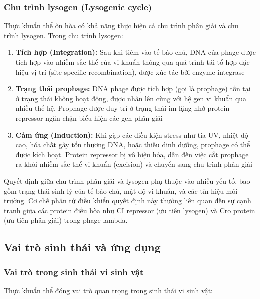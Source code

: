 \subsubsection{Chu trình lysogen (Lysogenic cycle)}

Thực khuẩn thể ôn hòa có khả năng thực hiện cả chu trình phân giải và chu trình lysogen. Trong chu trình lysogen:

\begin{enumerate}
    \item \textbf{Tích hợp (Integration):} Sau khi tiêm vào tế bào chủ, DNA của phage được tích hợp vào nhiễm sắc thể của vi khuẩn thông qua quá trình tái tổ hợp đặc hiệu vị trí (site-specific recombination), được xúc tác bởi enzyme integrase

    \item \textbf{Trạng thái prophage:} DNA phage được tích hợp (gọi là prophage) tồn tại ở trạng thái không hoạt động, được nhân lên cùng với hệ gen vi khuẩn qua nhiều thế hệ. Prophage được duy trì ở trạng thái im lặng nhờ protein repressor ngăn chặn biểu hiện các gen phân giải

    \item \textbf{Cảm ứng (Induction):} Khi gặp các điều kiện stress như tia UV, nhiệt độ cao, hóa chất gây tổn thương DNA, hoặc thiếu dinh dưỡng, prophage có thể được kích hoạt. Protein repressor bị vô hiệu hóa, dẫn đến việc cắt prophage ra khỏi nhiễm sắc thể vi khuẩn (excision) và chuyển sang chu trình phân giải
\end{enumerate}

Quyết định giữa chu trình phân giải và lysogen phụ thuộc vào nhiều yếu tố, bao gồm trạng thái sinh lý của tế bào chủ, mật độ vi khuẩn, và các tín hiệu môi trường. Cơ chế phân tử điều khiển quyết định này thường liên quan đến sự cạnh tranh giữa các protein điều hòa như CI repressor (ưu tiên lysogen) và Cro protein (ưu tiên phân giải) trong phage lambda.

\subsection{Vai trò sinh thái và ứng dụng}

\subsubsection{Vai trò trong sinh thái vi sinh vật}

Thực khuẩn thể đóng vai trò quan trọng trong sinh thái vi sinh vật:

